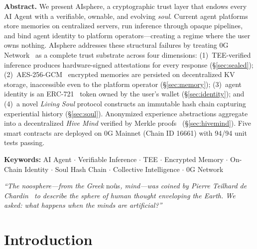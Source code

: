 \documentclass[10pt,a4paper]{article}
\theoremstyle{definition}
\theoremstyle{plain}
\begin{document}
\begin{quotebox}
\noindent\textbf{Abstract.}\quad
We present AIsphere, a cryptographic trust layer that endows every AI Agent with a verifiable, ownable, and evolving \emph{soul}. Current agent platforms store memories on centralized servers, run inference through opaque pipelines, and bind agent identity to platform operators---creating a regime where the user owns nothing. AIsphere addresses these structural failures by treating 0G Network~\cite{0g2025} as a complete trust substrate across four dimensions: (1)~TEE-verified inference produces hardware-signed attestations for every response (\S\ref{sec:sealed}); (2)~AES-256-GCM~\cite{nist-gcm} encrypted memories are persisted on decentralized KV storage, inaccessible even to the platform operator (\S\ref{sec:memory}); (3)~agent identity is an ERC-721~\cite{erc721} token owned by the user's wallet (\S\ref{sec:identity}); and (4)~a novel \emph{Living Soul} protocol constructs an immutable hash chain capturing experiential history (\S\ref{sec:soul}). Anonymized experience abstractions aggregate into a decentralized \emph{Hive Mind} verified by Merkle proofs~\cite{merkle1987} (\S\ref{sec:hivemind}). Five smart contracts are deployed on 0G Mainnet (Chain ID 16661) with 94/94 unit tests passing.

\vspace{4pt}
\noindent\textbf{Keywords:} AI Agent $\cdot$ Verifiable Inference $\cdot$ TEE $\cdot$ Encrypted Memory $\cdot$ On-Chain Identity $\cdot$ Soul Hash Chain $\cdot$ Collective Intelligence $\cdot$ 0G Network
\end{quotebox}

\vfill

\begin{quotebox}
\small\textit{``The noosphere---from the Greek} no\^{u}s\textit{, mind---was coined by Pierre Teilhard de Chardin~\cite{teilhard1955} to describe the sphere of human thought enveloping the Earth. We asked: what happens when the minds are artificial?''}
\end{quotebox}

\newpage

\tableofcontents
\newpage

\section{Introduction}
\label{sec:intro}
\end{document}
